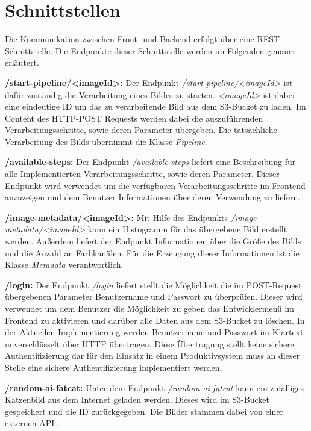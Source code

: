 \section{Schnittstellen}
\label{sec:schnittstellen}
Die Kommunikation zwischen Front- und Backend erfolgt über eine REST-Schnittstelle. Die Endpunkte dieser Schnittstelle werden im Folgenden genauer erläutert. 

\textbf{/start-pipeline/\textless imageId\textgreater: }Der Endpunkt \textit{/start-pipeline/\textless imageId\textgreater } ist dafür zuständig die Verarbeitung eines Bildes zu starten. \textit{\textless imageId\textgreater  } ist dabei eine eindeutige ID um das zu verarbeitende Bild aus dem S3-Bucket zu laden. Im Content des HTTP-POST Requests werden dabei die auszuführenden Verarbeitungsschritte, sowie deren Parameter übergeben. Die tatsächliche Verarbeitung des Bilds übernimmt die Klasse \textit{Pipeline}.

\textbf{/available-steps: }Der Endpunkt \textit{/available-steps} liefert eine Beschreibung für alle Implementierten Verarbeitungsschritte, sowie deren Parameter. Dieser Endpunkt wird verwendet um die verfügbaren Verarbeitungsschritte im Frontend anzuzeigen und dem Benutzer Informationen über deren Verwendung zu liefern.

\textbf{/image-metadata/\textless imageId\textgreater: }Mit Hilfe des Endpunkts \textit{/image-metadata/\textless imageId\textgreater } kann ein Histogramm für das übergebene Bild erstellt werden. Außerdem liefert der Endpunkt Informationen über die Größe des Bilds und die Anzahl an Farbkanälen. Für die Erzeugung dieser Informationen ist die Klasse \textit{Metadata} verantwortlich.

\textbf{/login: }Der Endpunkt \textit{/login} liefert stellt die Möglichkeit die im POST-Request übergebenen Parameter Benutzername und Passwort zu überprüfen. Dieser wird verwendet um dem Benutzer die Möglichkeit zu geben das Entwicklermenü im Frontend zu aktivieren und darüber alle Daten aus dem S3-Bucket zu löschen. In der Aktuellen Implementierung werden Benutzername und Passwort im Klartext unverschlüsselt über HTTP übertragen. Diese Übertragung stellt keine sichere Authentifizierung dar für den Einsatz in einem Produktivsystem muss an dieser Stelle eine sichere Authentifizierung implementiert werden.

\textbf{/random-ai-fatcat: }Unter dem Endpunkt \textit{/random-ai-fatcat} kann ein zufälliges Katzenbild aus dem Internet geladen werden. Dieses wird im S3-Bucket gespeichert und die ID zurückgegeben. Die Bilder stammen dabei von einer externen API \cite{catapi}. 
